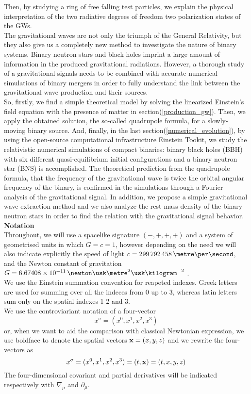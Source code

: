 Then, by studying a ring of free falling test particles, we explain the physical interpretation of the two radiative degrees of freedom two polarization states of the GWs.\\
The gravitational waves are not only the triumph of the General Relativity, but they also give us a completely new method to investigate the nature of binary systems. 
Binary neutron stars and black holes imprint a large amount of information in the produced gravitational radiations.
However, a thorough study of a gravitational signals needs to be combined with accurate numerical simulations of binary mergers in order to fully understand the link between the  gravitational wave production and their sources.\\
So, firstly, we find a simple theoretical model by solving the linearized Einstein's field equation with the presence of matter in section(\ref{production_gw}).
Then, we apply the obtained solution, the so-called quadrupole formula, for a slowly-moving binary source.
And, finally, in the last section(\ref{numerical_evolution}), by using the open-source computational infrastructure Einstein Tookit\cite{loffler_einstein_2012}, we study the relativistic numerical simulations of compact binaries: binary black holes (BBH) with six different quasi-equilibrium initial configurations and a binary neutron star (BNS) is accomplished.
The theoretical prediction from the quadrupole formula, that the frequency of the gravitational wave is twice the orbital angular frequency of the binary, is confirmed in the simulations through a Fourier analysis of the gravitational signal.
In addition, we propose a simple gravitational wave extraction method and we also analyze the rest mass density of the binary neutron stars in order to find the relation with the gravitational signal behavior.\\

\textbf{Notation}\\
Throughout, we will use a spacelike signature $(-,+,+,+)$ and a system of geometrised units in which $G=c=1$, however depending on the need we will also indicate explicitly the speed of light $c=299\,792\,458 \,\metre \per \second$, and the Newton constant of gravitation $G=6.67408 \times 10^{-11} \, \newton \usk \metre^2 \usk \kilogram^{-2}$ \cite{codata_blog_codata_nodate}.\\
We use the Einstein summation convention for  reapeted indexes.
Greek letters are used for summing over all the indeces from 0 up to 3,
whereas latin letters sum only on the spatial indexes 1 2 and 3.\\
We use the controviariant notation of a four-vector
\[
x^{\sigma} = (x^{0},x^{1}, x^{2},x^{3})
\]
or, when we want to aid the comparison with classical Newtonian expression, we use boldface to denote the spatial vectors $\vb{x} =(x,y,z)$ and we rewrite the four-vectors as 
\[
x^{\sigma} = (x^{0},x^{1}, x^{2},x^{3}) = (t,\vb{x}) = (t,x,y,z)
\]
The four-dimensional covariant and partial derivatives will be indicated respectively with $\nabla _{\mu}$ and $\partial _\mu$.\\

